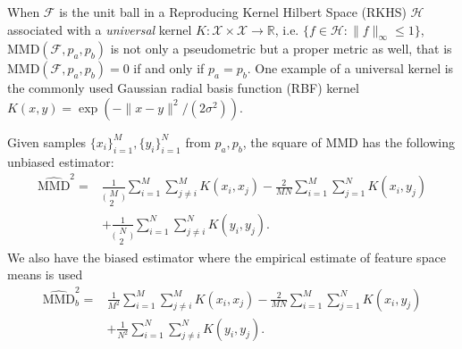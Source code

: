 \documentclass{article}
\begin{document}
When $\mathcal{F}$ is the unit ball in a Reproducing Kernel Hilbert Space (RKHS) $\mathcal{H}$ associated with a \textit{universal} kernel $K:\mathcal{X}\times\mathcal{X}\to\mathbb{R}$, i.e. $\{f\in\mathcal{H}:\|f\|_\infty \leq 1\}$, $\text{MMD}(\mathcal{F}, p_a, p_b)$ is not only a pseudometric but a proper metric as well, that is $\text{MMD}(\mathcal{F}, p_a, p_b)=0$ if and only if $p_a=p_b$. One example of a universal kernel is the commonly used Gaussian radial basis function (RBF) kernel $K(x, y)=\exp\left(-\|x-y\|^2/(2\sigma^2)\right)$.

Given samples $\{x_i\}^M_{i=1},\{y_i\}^N_{i=1}$ from $p_a, p_b$, the square of MMD has the following unbiased estimator:
\begin{equation*}
    \begin{aligned}
        \widehat{\text{MMD}}^2=&\frac{1}{ \bigl(\begin{smallmatrix} M \\ 2 \end{smallmatrix}\bigr) }\sum_{i=1}^M\sum_{j\neq i}^M K(x_i,x_j) 
        -\frac{2}{MN}\sum_{i=1}^M\sum_{j=1}^N K(x_i,y_j) \\
        &+\frac{1}{ \bigl(\begin{smallmatrix} N \\ 2 \end{smallmatrix}\bigr) }\sum_{i=1}^N\sum_{j\neq i}^N K(y_i,y_j).
    \end{aligned}
\end{equation*}
We also have the biased estimator where the empirical estimate of feature space means is used
\begin{equation*}
    \begin{aligned}
        \widehat{\text{MMD}}^2_b=&\frac{1}{ M^2 }\sum_{i=1}^M\sum_{j\neq i}^M K(x_i,x_j) 
        -\frac{2}{MN}\sum_{i=1}^M\sum_{j=1}^N K(x_i,y_j) \\
        &+\frac{1}{ N^2 }\sum_{i=1}^N\sum_{j\neq i}^N K(y_i,y_j).
    \end{aligned}
\end{equation*}
\end{document}

